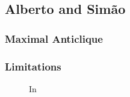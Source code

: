 \subsection{Alberto and Sim\~ao}

\subsubsection{Maximal Anticlique}

\subsubsection{Limitations}
\begin{figure}
\caption{{}
In 
}
\end{figure}


